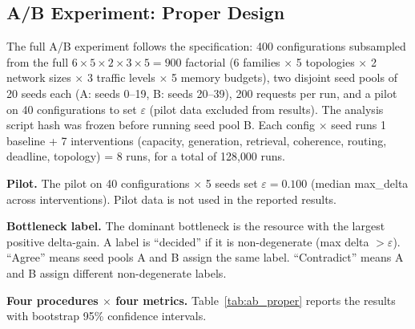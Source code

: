 \documentclass[aps,prapplied,reprint,superscriptaddress]{revtex4-2}
\begin{document}
\subsection{A/B Experiment: Proper Design}
\label{sec:ab_proper}

The full A/B experiment follows the specification: 400 configurations subsampled from the full $6 \times 5 \times 2 \times 3 \times 5 = 900$ factorial (6 families $\times$ 5 topologies $\times$ 2 network sizes $\times$ 3 traffic levels $\times$ 5 memory budgets), two disjoint seed pools of 20 seeds each (A: seeds 0--19, B: seeds 20--39), 200 requests per run, and a pilot on 40 configurations to set $\varepsilon$ (pilot data excluded from results). The analysis script hash was frozen before running seed pool B. Each config $\times$ seed runs 1 baseline + 7 interventions (capacity, generation, retrieval, coherence, routing, deadline, topology) = 8 runs, for a total of 128{,}000 runs.

\textbf{Pilot.} The pilot on 40 configurations $\times$ 5 seeds set $\varepsilon = 0.100$ (median max\_delta across interventions). Pilot data is not used in the reported results.

\textbf{Bottleneck label.} The dominant bottleneck is the resource with the largest positive delta-gain. A label is ``decided'' if it is non-degenerate (max delta $> \varepsilon$). ``Agree'' means seed pools A and B assign the same label. ``Contradict'' means A and B assign different non-degenerate labels.

\textbf{Four procedures $\times$ four metrics.} Table~\ref{tab:ab_proper} reports the results with bootstrap 95\% confidence intervals.

\begin{table}[htbp]
\centering
\caption{A/B experiment with actual bottleneck diagnosis: four procedures $\times$ four metrics, with bootstrap 95\% CI. 400 configurations, 2$\times$20 seeds, 200 requests, 8 runs per config per seed (128{,}000 total runs).}
\label{tab:ab_proper}
\setlength{\tabcolsep}{3pt}
\end{table}
\end{document}
